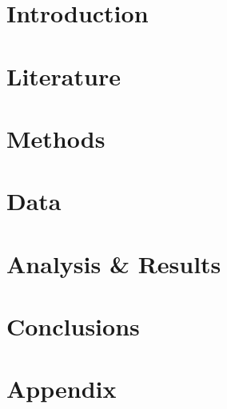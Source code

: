 \documentclass[hidelinks,11pt]{article} %
\begin{document}
\section{Introduction} \label{introduction}

	

\section{Literature} \label{literature}

	

\section{Methods} \label{methods}

	


\section{Data} \label{data} 

	

\section{Analysis \& Results}\label{analysis}

	


\section{Conclusions} \label{conclusions}

	


\pagebreak

\section{Appendix}



\pagebreak

\printbibliography
\end{document}
